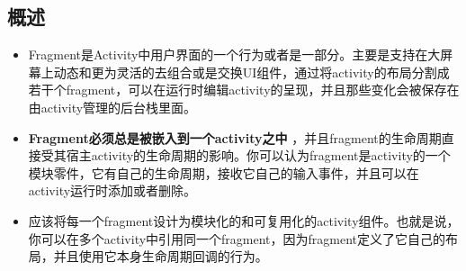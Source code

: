 \documentclass[9pt, b5paper]{article}
\begin{document}
\subsection{概述}
\label{sec-2-1}
\begin{itemize}
\item Fragment是Activity中用户界面的一个行为或者是一部分。主要是支持在大屏幕上动态和更为灵活的去组合或是交换UI组件，通过将activity的布局分割成若干个fragment，可以在运行时编辑activity的呈现，并且那些变化会被保存在由activity管理的后台栈里面。
\item \textbf{Fragment必须总是被嵌入到一个activity之中} ，并且fragment的生命周期直接受其宿主activity的生命周期的影响。你可以认为fragment是activity的一个模块零件，它有自己的生命周期，接收它自己的输入事件，并且可以在activity运行时添加或者删除。
\item 应该将每一个fragment设计为模块化的和可复用化的activity组件。也就是说，你可以在多个activity中引用同一个fragment，因为fragment定义了它自己的布局，并且使用它本身生命周期回调的行为。
\end{itemize}
\end{document}
